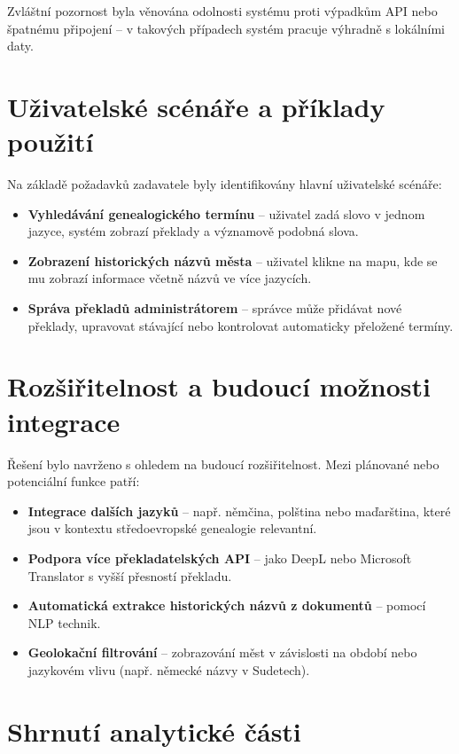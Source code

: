 \documentclass[czech, ba, kiv, he]{fasthesis}
\begin{document}
Zvláštní pozornost byla věnována odolnosti systému proti výpadkům API nebo špatnému připojení – v takových případech systém pracuje výhradně s lokálními daty.

\section{Uživatelské scénáře a příklady použití}

Na základě požadavků zadavatele byly identifikovány hlavní uživatelské scénáře:

\begin{itemize}
    \item \textbf{Vyhledávání genealogického termínu} – uživatel zadá slovo v jednom jazyce, systém zobrazí překlady a významově podobná slova.
    \item \textbf{Zobrazení historických názvů města} – uživatel klikne na mapu, kde se mu zobrazí informace včetně názvů ve více jazycích.
    \item \textbf{Správa překladů administrátorem} – správce může přidávat nové překlady, upravovat stávající nebo kontrolovat automaticky přeložené termíny.
\end{itemize}

\section{Rozšiřitelnost a budoucí možnosti integrace}

Řešení bylo navrženo s ohledem na budoucí rozšiřitelnost. Mezi plánované nebo potenciální funkce patří:

\begin{itemize}
    \item \textbf{Integrace dalších jazyků} – např. němčina, polština nebo maďarština, které jsou v kontextu středoevropské genealogie relevantní.
    \item \textbf{Podpora více překladatelských API} – jako DeepL nebo Microsoft Translator s vyšší přesností překladu.
    \item \textbf{Automatická extrakce historických názvů z dokumentů} – pomocí NLP technik.
    \item \textbf{Geolokační filtrování} – zobrazování měst v závislosti na období nebo jazykovém vlivu (např. německé názvy v Sudetech).
\end{itemize}

\section{Shrnutí analytické části}
\end{document}
